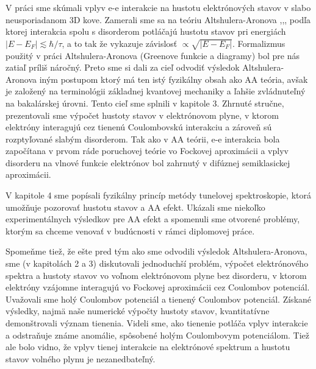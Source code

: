 V práci sme skúmali vplyv e-e interakcie na hustotu elektrónových stavov v slabo neusporiadanom 3D kove. Zamerali sme sa na teóriu Altshulera-Aronova
\cite{Altshuler1},\cite{Altshuler3},\cite{Altshuler4}, podľa ktorej interakcia spolu s disorderom potláčajú hustotu stavov pri energiách $|E-E_F| \lesssim \hbar/\tau$, a to tak že vykazuje závislosť $\propto \sqrt{|E-E_F|}$.
Formalizmus použitý v práci Altshulera-Aronova (Greenove funkcie a diagramy) bol pre nás zatiaľ príliš náročný.
Preto sme si dali za cieľ odvodiť výsledok Altshulera-Aronova iným
postupom \cite{MoskovaUnpub1} ktorý má ten istý fyzikálny obsah ako AA teória, avšak je založený na terminológii základnej kvantovej mechaniky a ľahšie zvládnuteľný na bakalárskej úrovni.
Tento cieľ sme splnili v kapitole 3. Zhrnuté stručne, prezentovali sme výpočet hustoty
stavov v elektrónovom plyne, v ktorom elektróny interagujú cez tienenú Coulombovskú interakciu a zároveň sú rozptyľované slabým disorderom. Tak ako v AA teórii, e-e interakcia bola započítana v prvom ráde poruchovej teórie vo Fockovej aproximácii a
vplyv disorderu na vlnové funkcie elektrónov bol zahrnutý v difúznej semiklasickej aproximácii.

V kapitole 4 sme popísali fyzikálny princíp metódy tunelovej spektroskopie, ktorá umožňuje pozorovať hustotu stavov a AA efekt.
Ukázali sme niekoľko experimentálnych výsledkov pre AA efekt a spomenuli sme otvorené problémy, ktorým sa chceme venovať v budúcnosti v rámci diplomovej práce.

Spomeňme tiež, že ešte pred tým ako sme odvodili výsledok Altshulera-Aronova, sme (v kapitolách 2 a 3) diskutovali jednoduchší problém, výpočet elektrónového spektra a hustoty stavov vo voľnom elektrónovom plyne bez disorderu, v ktorom elektróny vzájomne interagujú vo Fockovej
aproximácii cez Coulombov potenciál. Uvažovali sme holý Coulombov potenciál a tienený Coulombov potenciál. Získané výsledky, najmä naše numerické výpočty hustoty stavov, kvantitatívne demonštrovali význam tienenia. Videli sme, ako
tienenie potláča vplyv interakcie a odstraňuje známe anomálie, spôsobené holým Coulombovym potenciálom. Tiež ale bolo vidno, že vplyv tienej interakcie na elektrónové spektrum a hustotu stavov volného plynu
je nezanedbateľný.

